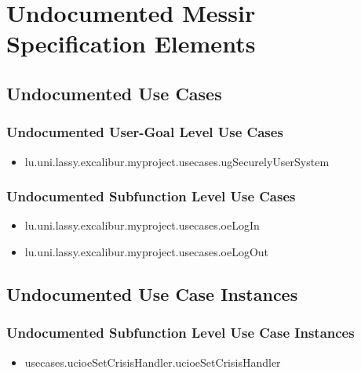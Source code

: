 	
\chapter{Undocumented Messir Specification Elements}


\section[Undocumented Use Cases]{Undocumented Use Cases}


\subsection[Undocumented Use Cases - User-Goal Level]{Undocumented User-Goal Level Use Cases}
\begin{itemize}
\item lu.uni.lassy.excalibur.myproject.usecases.ugSecurelyUserSystem 
\end{itemize}

\subsection[Undocumented Use Cases - Subfunction Level]{Undocumented Subfunction Level Use Cases}
\begin{itemize}
\item lu.uni.lassy.excalibur.myproject.usecases.oeLogIn 
\item lu.uni.lassy.excalibur.myproject.usecases.oeLogOut 
\end{itemize}





\section[Undocumented Use Case Instances]{Undocumented Use Case Instances}



\subsection[Undocumented Use Case Instances - Subfunction Level]{Undocumented Subfunction Level Use Case Instances}
\begin{itemize}
\item usecases.ucioeSetCrisisHandler.ucioeSetCrisisHandler 
\end{itemize}




